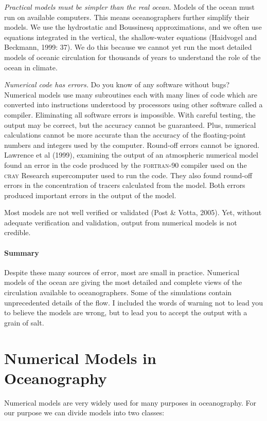 \textit{Practical models must be simpler than the real ocean.} Models
of the ocean must run on available computers. This means
oceanographers further simplify their models. We use the hydrostatic
and Boussinesq approximations, and we
often use equations integrated in the vertical, the shallow-water
equations (Haidvogel and Beckmann, 1999: 37). We do this because we
cannot yet run the most detailed models of oceanic circulation for
thousands of years to understand the role of the ocean in climate.

\textit{Numerical code has errors.} Do you know of any software
without bugs? Numerical models use many subroutines each with many
lines of code which are converted into instructions understood by
processors using other software called a compiler. Eliminating all
software errors is impossible. With careful testing, the output may be
correct, but the accuracy cannot be
guaranteed. Plus, numerical calculations cannot be more accurate than
the accuracy of the floating-point numbers and integers used by the
computer.  Round-off errors cannot be ignored. Lawrence et al (1999),
examining the output of an atmospheric numerical model found an error
in the code produced by the \textsc{fortran-90} compiler used on the
\textsc{cray} Research supercomputer used to run the code. They also
found round-off errors in the concentration of tracers calculated from
the model. Both errors produced important errors in the output of the
model.

Most models are not well verified or validated (Post \& Votta,
2005). Yet, without adequate verification and validation, output from
numerical models is not credible.

\paragraph{Summary}
Despite these many sources of error, most are small in
practice. Numerical models of the ocean are giving the most detailed
and complete views of the circulation available to
oceanographers. Some of the simulations contain unprecedented details
of the flow. I included the words of warning not to lead you to
believe the models are wrong, but to lead you to accept the output
with a grain of salt.

\section{Numerical Models in Oceanography}
Numerical models are very widely used for many purposes in
oceanography. For our purpose we can divide models into two classes:

